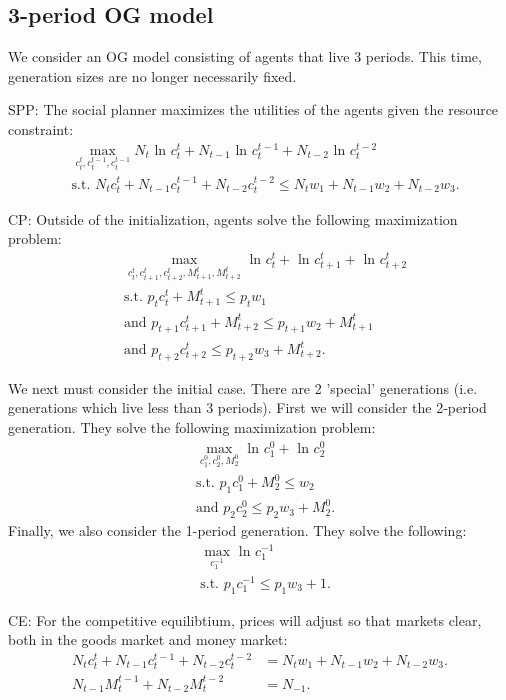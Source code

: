 \documentclass[11pt]{article} %
\begin{document}
\subsection{3-period OG model}
We consider an OG model consisting of agents that live 3 periods. This time, generation sizes are no longer necessarily fixed.

SPP: The social planner maximizes the utilities of the agents given the resource constraint: 
\begin{align*}
&\max_{c_t^{t},c_{t}^{t-1},c_{t}^{t-1}} N_{t}\text{ ln } c_{t}^{t} + N_{t-1}\text{ ln } c_{t}^{t-1} + N_{t-2}\text{ ln } c_{t}^{t-2}\\
&\text{s.t. }  N_{t}c_{t}^{t} +  N_{t-1}c_{t}^{t-1} + N_{t-2}c_{t}^{t-2}\leq N_{t}w_1 + N_{t-1}w_2 + N_{t-2}w_3.
\end{align*}


CP: Outside of the initialization, agents solve the following maximization problem:
\begin{align*}
&\max_{c_t^{t},c_{t+1}^{t},c_{t+2}^{t},M_{t+1}^{t},M_{t+2}^{t}} \text{ ln } c_{t}^{t} + \text{ ln } c_{t+1}^{t}+ \text{ ln } c_{t+2}^{t}\\
&\text{s.t. }  p_t c_{t}^{t} + M_{t+1}^t \leq p_t w_1 \\
& \text{and } p_{t+1} c_{t+1}^t  + M_{t+2}^t \leq  p_{t+1} w_2 + M_{t+1}^t \\
& \text{and } p_{t+2} c_{t+2}^t \leq p_{t+2} w_3 + M_{t+2}^t.
\end{align*}

We next must consider the initial case. There are 2 'special' generations (i.e. generations which live less than 3 periods). First we will consider the 2-period generation. They solve the following maximization problem:
\begin{align*}
&\max_{c_{1}^{0},c_{2}^{0},M_{2}^{0}}  \text{ ln } c_{1}^{0}+ \text{ ln } c_{2}^{0}\\
& \text{s.t. } p_{1} c_{1}^0  + M_{2}^0 \leq  w_2 \\
& \text{and } p_{2} c_{2}^0 \leq p_2 w_3 + M_{2}^0.
\end{align*}
Finally, we also consider the 1-period generation. They solve the following:
\begin{align*}
&\max_{c_{1}^{-1}}  \text{ ln } c_{1}^{-1}\\
& \text{s.t. } p_{1} c_{1}^{-1} \leq p_1 w_3 + 1.
\end{align*}

CE: For the competitive equilibtium, prices will adjust so that markets clear, both in the goods market and money market:
\begin{align*}
N_{t}c_{t}^{t} +  N_{t-1}c_{t}^{t-1} + N_{t-2}c_{t}^{t-2} &= N_{t}w_1 + N_{t-1}w_2 + N_{t-2}w_3.\\
N_{t-1} M_{t}^{t-1} + N_{t-2}M_{t}^{t-2} &= N_{-1}.
\end{align*}
\end{document}
